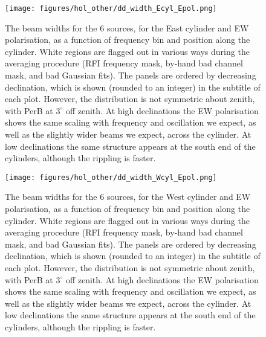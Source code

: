 \begin{figure}[h!]
\begin{center}
\texttt{[image: figures/hol\_other/dd\_width\_Ecyl\_Epol.png]}
\caption{The beam widths for the 6 sources, for the East cylinder and EW polarisation, as a function of frequency bin and position along the cylinder. White regions are flagged out in various ways during the averaging procedure (RFI frequency mask, by-hand bad channel mask, and bad Gaussian fits). The panels are ordered by decreasing declination, which is shown (rounded to an integer) in the subtitle of each plot. However, the distribution is not symmetric about zenith, with PerB at $3^{\circ}$ off zenith. \newline At high declinations the EW polarisation shows the same scaling with frequency and oscillation we expect, as well as the slightly wider beams we expect, across the cylinder. At low declinations the same structure appears at the south end of the cylinders, although the rippling is faster.}
\end{center}
\end{figure}

\begin{figure}[h!]
\begin{center}
\texttt{[image: figures/hol\_other/dd\_width\_Wcyl\_Epol.png]}
\caption{The beam widths for the 6 sources, for the West cylinder and EW polarisation, as a function of frequency bin and position along the cylinder. White regions are flagged out in various ways during the averaging procedure (RFI frequency mask, by-hand bad channel mask, and bad Gaussian fits). The panels are ordered by decreasing declination, which is shown (rounded to an integer) in the subtitle of each plot. However, the distribution is not symmetric about zenith, with PerB at $3^{\circ}$ off zenith. \newline At high declinations the EW polarisation shows the same scaling with frequency and oscillation we expect, as well as the slightly wider beams we expect, across the cylinder. At low declinations the same structure appears at the south end of the cylinders, although the rippling is faster.}
\end{center}
\end{figure}


